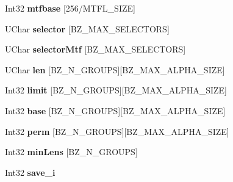 \begin{DoxyCompactItemize}
\item 
\hypertarget{structDState_ac904f9b1d9853e89cec2e2eb641d5cf2}{Int32 {\bfseries mtfbase} \mbox{[}256/M\-T\-F\-L\-\_\-\-S\-I\-Z\-E\mbox{]}}\label{structDState_ac904f9b1d9853e89cec2e2eb641d5cf2}

\item 
\hypertarget{structDState_a1743228374dd82d180e7681606fab3a5}{U\-Char {\bfseries selector} \mbox{[}B\-Z\-\_\-\-M\-A\-X\-\_\-\-S\-E\-L\-E\-C\-T\-O\-R\-S\mbox{]}}\label{structDState_a1743228374dd82d180e7681606fab3a5}

\item 
\hypertarget{structDState_ac7409a930fc14261a1acd63f522bb41c}{U\-Char {\bfseries selector\-Mtf} \mbox{[}B\-Z\-\_\-\-M\-A\-X\-\_\-\-S\-E\-L\-E\-C\-T\-O\-R\-S\mbox{]}}\label{structDState_ac7409a930fc14261a1acd63f522bb41c}

\item 
\hypertarget{structDState_a88edd2962af797d38ea4a3c55be334f0}{U\-Char {\bfseries len} \mbox{[}B\-Z\-\_\-\-N\-\_\-\-G\-R\-O\-U\-P\-S\mbox{]}\mbox{[}B\-Z\-\_\-\-M\-A\-X\-\_\-\-A\-L\-P\-H\-A\-\_\-\-S\-I\-Z\-E\mbox{]}}\label{structDState_a88edd2962af797d38ea4a3c55be334f0}

\item 
\hypertarget{structDState_aea1992c1a30e81eaa3ecdde3b3896132}{Int32 {\bfseries limit} \mbox{[}B\-Z\-\_\-\-N\-\_\-\-G\-R\-O\-U\-P\-S\mbox{]}\mbox{[}B\-Z\-\_\-\-M\-A\-X\-\_\-\-A\-L\-P\-H\-A\-\_\-\-S\-I\-Z\-E\mbox{]}}\label{structDState_aea1992c1a30e81eaa3ecdde3b3896132}

\item 
\hypertarget{structDState_a23de4c4eeba321c5ecbcd568be0a9a10}{Int32 {\bfseries base} \mbox{[}B\-Z\-\_\-\-N\-\_\-\-G\-R\-O\-U\-P\-S\mbox{]}\mbox{[}B\-Z\-\_\-\-M\-A\-X\-\_\-\-A\-L\-P\-H\-A\-\_\-\-S\-I\-Z\-E\mbox{]}}\label{structDState_a23de4c4eeba321c5ecbcd568be0a9a10}

\item 
\hypertarget{structDState_a82ff7b0baca1439233c657fa0768d551}{Int32 {\bfseries perm} \mbox{[}B\-Z\-\_\-\-N\-\_\-\-G\-R\-O\-U\-P\-S\mbox{]}\mbox{[}B\-Z\-\_\-\-M\-A\-X\-\_\-\-A\-L\-P\-H\-A\-\_\-\-S\-I\-Z\-E\mbox{]}}\label{structDState_a82ff7b0baca1439233c657fa0768d551}

\item 
\hypertarget{structDState_a9944a4ca76768834180a835d97513e93}{Int32 {\bfseries min\-Lens} \mbox{[}B\-Z\-\_\-\-N\-\_\-\-G\-R\-O\-U\-P\-S\mbox{]}}\label{structDState_a9944a4ca76768834180a835d97513e93}

\item 
\hypertarget{structDState_a627cbd8ee46db9d0f2ebced60295961a}{Int32 {\bfseries save\-\_\-i}}\label{structDState_a627cbd8ee46db9d0f2ebced60295961a}


\end{DoxyCompactItemize}
